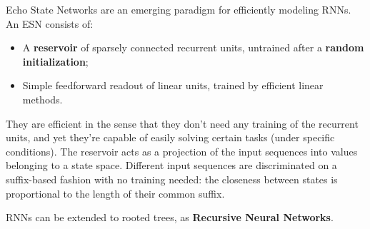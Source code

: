 Echo State Networks are an emerging paradigm for efficiently modeling RNNs. An ESN consists of:
\begin{itemize}
    \item A \textbf{reservoir} of sparsely connected recurrent units, untrained after a \textbf{random initialization};

    \item Simple feedforward readout of linear units, trained by efficient linear methods.
\end{itemize}
They are efficient in the sense that they don't need any training of the recurrent units, and yet they're capable of easily solving certain tasks (under specific conditions). The reservoir acts as a projection of the input sequences into values belonging to a state space. Different input sequences are discriminated on a suffix-based fashion with no training needed: the closeness between states is proportional to the length of their common suffix.

RNNs can be extended to rooted trees, as \textbf{Recursive Neural Networks}. 